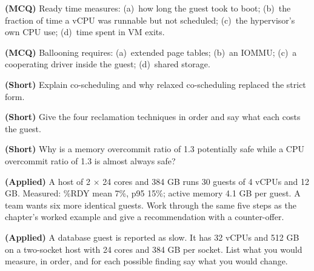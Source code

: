 \begin{reviewq}
  \item \textbf{(MCQ)} Ready time measures: (a)~how long the guest took to
        boot; (b)~the fraction of time a vCPU was runnable but not scheduled;
        (c)~the hypervisor's own CPU use; (d)~time spent in VM exits.
  \item \textbf{(MCQ)} Ballooning requires: (a)~extended page tables; (b)~an
        IOMMU; (c)~a cooperating driver inside the guest; (d)~shared storage.
  \item \textbf{(Short)} Explain co-scheduling and why relaxed co-scheduling
        replaced the strict form.
  \item \textbf{(Short)} Give the four reclamation techniques in order and say
        what each costs the guest.
  \item \textbf{(Short)} Why is a memory overcommit ratio of 1.3 potentially
        safe while a CPU overcommit ratio of 1.3 is almost always safe?
  \item \textbf{(Applied)} A host of 2 $\times$ 24 cores and 384 GB runs 30
        guests of 4 vCPUs and 12 GB. Measured: \%RDY mean 7\%, p95 15\%; active
        memory 4.1 GB per guest. A team wants six more identical guests.
        Work through the same five steps as the chapter's worked example and
        give a recommendation with a counter-offer.
  \item \textbf{(Applied)} A database guest is reported as slow. It has 32
        vCPUs and 512 GB on a two-socket host with 24 cores and 384 GB per
        socket. List what you would measure, in order, and for each possible
        finding say what you would change.
\end{reviewq}
